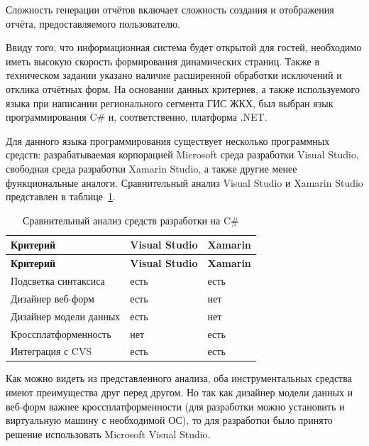 Сложность генерации отчётов включает сложность создания и отображения отчёта, предоставляемого пользователю.

Ввиду того, что информационная система будет открытой для гостей, необходимо иметь высокую скорость формирования динамических страниц.
Также в техническом задании указано наличие расширенной обработки исключений и отклика отчётных форм.
На основании данных критериев, а также используемого языка при написании регионального сегмента ГИС ЖКХ, был выбран язык программирования C\# и, соответственно, платформа .NET.

Для данного языка программирования существует несколько программных средств: разрабатываемая корпорацией Microsoft среда разработки Visual Studio, свободная среда разработки Xamarin Studio, а также другие менее функциональные аналоги.
Сравнительный анализ Visual Studio и Xamarin Studio представлен в таблице~\ref{tab:software-sharpide}.

\begin{footnotesize}
\begin{longtable}[h]{|p{}|p{}|p{}|}
	\caption{\label{tab:software-sharpide}Сравнительный анализ средств разработки на C\#} \\
	\hline
		\textbf{Критерий} &
		\textbf{Visual Studio} &
		\textbf{Xamarin} \\
	\hline \endfirsthead
	\hline
		\textbf{Критерий} &
		\textbf{Visual Studio} &
		\textbf{Xamarin} \\
	\hline \endhead
	Подсветка синтаксиса & 
	есть & есть \\ \hline
	
	Дизайнер веб-форм & 
	есть & нет \\ \hline
	
	Дизайнер модели данных & 
	есть & нет \\ \hline
	
	Кроссплатформенность & 
	нет & есть \\ \hline
	
	Интеграция с CVS & 
	есть & есть \\ \hline
\end{longtable}
\end{footnotesize}

Как можно видеть из представленного анализа, оба инструментальных средства имеют преимущества друг перед другом.
Но так как дизайнер модели данных и веб-форм важнее кроссплатформенности (для разработки можно установить и виртуальную машину с необходимой ОС), то для разработки было принято решение использовать Microsoft Visual Studio.

